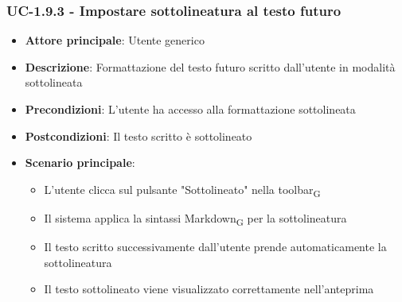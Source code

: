 \documentclass[11pt,a4paper]{article}
\newcommand{\gls}[1]{#1\textsubscript{G}}
\begin{document}
\subsubsection{UC-1.9.3 - Impostare sottolineatura al testo futuro}
\begin{itemize}
    \item \textbf{Attore principale}: Utente generico
    \item \textbf{Descrizione}: Formattazione del testo futuro scritto dall’utente in modalità sottolineata

    \item \textbf{Precondizioni}: L’utente ha accesso alla formattazione sottolineata
    \item \textbf{Postcondizioni}: Il testo scritto è sottolineato
    \item \textbf{Scenario principale}:
        \begin{itemize}
            \item L’utente clicca sul pulsante "Sottolineato" nella \gls{toolbar}
            \item Il sistema applica la sintassi \gls{Markdown} per la sottolineatura
            \item Il testo scritto successivamente dall'utente prende automaticamente la sottolineatura
            \item Il testo sottolineato viene visualizzato correttamente nell'anteprima
        \end{itemize}
\end{itemize}
\end{document}
